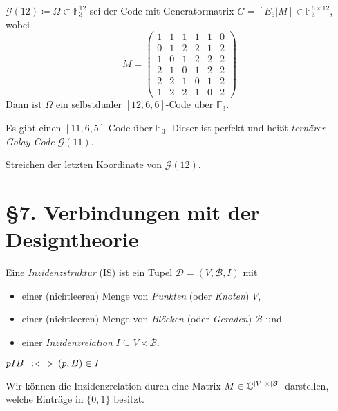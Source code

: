 \documentclass{cheat-sheet}
\newcommand{\F}{\mathbb{F}} %
\newcommand{\Golay}{\mathcal{G}} %
\newcommand{\Design}{\mathcal{D}} %
\newcommand{\Blocks}{\mathcal{B}} %
\begin{document}
\begin{satz}
  $\Golay(12) \coloneqq \Omega \subset \F_3^{12}$ sei der Code mit Generatormatrix $G=[E_6|M] \in \F_3^{6 \times 12}$, wobei
  \[
    M = \begin{pmatrix}
      1 & 1 & 1 & 1 & 1 & 0 \\
      0 & 1 & 2 & 2 & 1 & 2 \\
      1 & 0 & 1 & 2 & 2 & 2 \\
      2 & 1 & 0 & 1 & 2 & 2 \\
      2 & 2 & 1 & 0 & 1 & 2 \\
      1 & 2 & 2 & 1 & 0 & 2
    \end{pmatrix}
  \]
  Dann ist $\Omega$ ein selbstdualer $[12, 6, 6]$-Code über $\F_3$.
\end{satz}


\begin{satz}
  Es gibt einen $[11, 6, 5]$-Code über $\F_3$. Dieser ist perfekt und heißt \emph{ternärer Golay-Code $\Golay(11)$}.
\end{satz}

\begin{konstr}
  Streichen der letzten Koordinate von $\Golay(12)$.
\end{konstr}

\section{§7. Verbindungen mit der Designtheorie}

\begin{defn}
  Eine \emph{Inzidenzstruktur} (IS) ist ein Tupel $\Design = (V, \Blocks, I)$ mit
  \begin{itemize}
    \item einer (nichtleeren) Menge von \emph{Punkten} (oder \textit{Knoten}) $V$,
    \item einer (nichtleeren) Menge von \emph{Blöcken} (oder \textit{Geraden}) $\Blocks$ und
    \item einer \emph{Inzidenzrelation} $I \subseteq V \times \Blocks$.
  \end{itemize}
\end{defn}

\begin{nota}
  $p I B \enspace:\!\iff (p, B) \in I$
\end{nota}

\begin{bem}
  Wir können die Inzidenzrelation durch eine Matrix $M \in \C^{\abs{V} \times \abs{\Blocks}}$ darstellen, welche Einträge in $\{ 0, 1 \}$ besitzt.
\end{bem}
\end{document}
